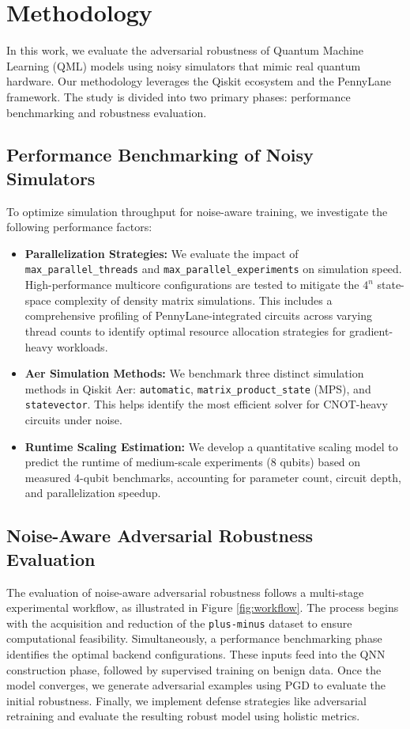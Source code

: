 \section{Methodology}

In this work, we evaluate the adversarial robustness of Quantum Machine Learning (QML) models using noisy simulators that mimic real quantum hardware. Our methodology leverages the Qiskit \cite{Qiskit} ecosystem and the PennyLane \cite{PennyLane} framework. The study is divided into two primary phases: performance benchmarking and robustness evaluation.

\subsection{Performance Benchmarking of Noisy Simulators}

To optimize simulation throughput for noise-aware training, we investigate the following performance factors:

\begin{itemize}
    \item \textbf{Parallelization Strategies:} We evaluate the impact of \texttt{max\_parallel\_threads} and \texttt{max\_parallel\_experiments} on simulation speed. High-performance multicore configurations are tested to mitigate the $4^n$ state-space complexity of density matrix simulations. This includes a comprehensive profiling of PennyLane-integrated circuits across varying thread counts to identify optimal resource allocation strategies for gradient-heavy workloads.
    \item \textbf{Aer Simulation Methods:} We benchmark three distinct simulation methods in Qiskit Aer: \texttt{automatic}, \texttt{matrix\_product\_state} (MPS), and \texttt{statevector}. This helps identify the most efficient solver for CNOT-heavy circuits under noise.
    \item \textbf{Runtime Scaling Estimation:} We develop a quantitative scaling model to predict the runtime of medium-scale experiments (8 qubits) based on measured 4-qubit benchmarks, accounting for parameter count, circuit depth, and parallelization speedup.
\end{itemize}

\subsection{Noise-Aware Adversarial Robustness Evaluation}

The evaluation of noise-aware adversarial robustness follows a multi-stage experimental workflow, as illustrated in Figure \ref{fig:workflow}. The process begins with the acquisition and reduction of the \texttt{plus-minus} dataset to ensure computational feasibility. Simultaneously, a performance benchmarking phase identifies the optimal backend configurations. These inputs feed into the QNN construction phase, followed by supervised training on benign data. Once the model converges, we generate adversarial examples using PGD to evaluate the initial robustness. Finally, we implement defense strategies like adversarial retraining and evaluate the resulting robust model using holistic metrics.

